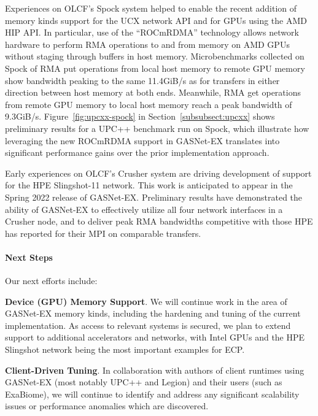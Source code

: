 Experiences on OLCF's Spock system helped to enable the recent addition of
memory kinds support for the UCX network API and for GPUs using the AMD HIP API.
In particular, use of the ``ROCmRDMA'' technology allows network hardware to
perform RMA operations to and from memory on AMD GPUs without staging through
buffers in host memory.
%
Microbenchmarks collected on Spock of RMA put operations from local host memory
to remote GPU memory show bandwidth peaking to the same 11.4GiB/s as for
transfers in either direction between host memory at both ends.
Meanwhile, RMA get operations from remote GPU memory to local host memory reach
a peak bandwidth of 9.3GiB/s.  
%
Figure~\ref{fig:upcxx-spock} in Section~\ref{subsubsect:upcxx}
shows preliminary results for a UPC++ benchmark run on Spock, which illustrate
how leveraging the new ROCmRDMA support in GASNet-EX translates into significant
performance gains over the prior implementation approach.

Early experiences on OLCF's Crusher system are driving development of support
for the HPE Slingshot-11 network.  This work is anticipated to appear in the
Spring 2022 release of GASNet-EX.  Preliminary results have demonstrated the
ability of GASNet-EX to effectively utilize all four network interfaces in a
Crusher node, and to deliver peak RMA bandwidths competitive with those HPE
has reported for their MPI on comparable transfers.

\paragraph{Next Steps}

Our next efforts include:

\textbf{Device (GPU) Memory Support}.
We will continue work in the area of GASNet-EX memory kinds, including the
hardening and tuning of the current implementation.
As access to relevant systems is secured, we plan to extend support to
additional accelerators and networks, with Intel GPUs and the HPE Slingshot
network being the most important examples for ECP.

\textbf{Client-Driven Tuning}.
In collaboration with authors of client runtimes using GASNet-EX (most notably
UPC++ and Legion) and their users (such as ExaBiome), we will continue to
identify and address any significant scalability issues or performance
anomalies which are discovered.

\clearpage
